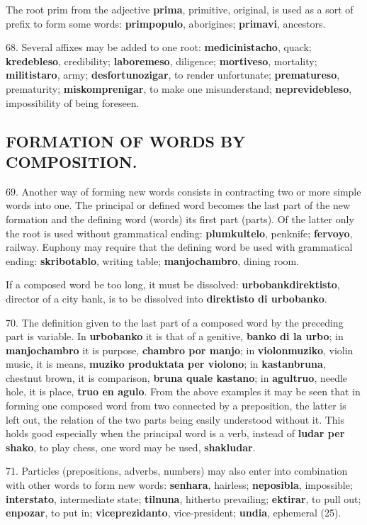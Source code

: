 The root prim from the adjective \textbf{prima}, primitive, original, is used as a sort of prefix to form some words: \textbf{primpopulo}, aborigines; \textbf{primavi}, ancestors. 

68. Several affixes may be added to one root: \textbf{medicinistacho}, quack; \textbf{kredebleso}, credibility; \textbf{laboremeso}, diligence; \textbf{mortiveso}, mortality; \textbf{militistaro}, army; \textbf{desfortunozigar}, to render unfortunate; \textbf{prematureso}, prematurity; \textbf{miskomprenigar}, to make one misunderstand; \textbf{neprevidebleso}, impossibility of being foreseen.

\subsection*{FORMATION OF WORDS BY COMPOSITION.}
69. Another way of forming new words consists in contracting two or more simple words into one. The principal or defined word becomes the last part of the new formation and the defining word (words) its first part (parts). Of the latter only the root is used without grammatical ending: \textbf{plumkultelo}, penknife; \textbf{fervoyo}, railway. Euphony may require that the defining word be used with grammatical ending: \textbf{skribotablo}, writing table; \textbf{manjochambro}, dining room. 

If a composed word be too long, it must be dissolved: \textbf{urbobankdirektisto}, director of a city bank, is to be dissolved into \textbf{direktisto di urbobanko}. 

70. The definition given to the last part of a composed word by the preceding part is variable. In \textbf{urbobanko} it is that of a genitive, \textbf{banko di la urbo}; in \textbf{manjochambro} it is purpose, \textbf{chambro por manjo}; in \textbf{violonmuziko}, violin music, it is means, \textbf{muziko produktata per violono}; in \textbf{kastanbruna}, chestnut brown, it is comparison, \textbf{bruna quale kastano}; in \textbf{agultruo}, needle hole, it is place, \textbf{truo en agulo}. From the above examples it may be seen that in forming one composed word from two connected by a preposition, the latter is left out, the relation of the two parts being easily understood without it. This holds good especially when the principal word is a verb, instead of \textbf{ludar per shako}, to play chess, one word may be used, \textbf{shakludar}. 

71. Particles (prepositions, adverbs, numbers) may also enter into combination with other words to form new words: \textbf{senhara}, hairless; \textbf{neposibla}, impossible; \textbf{interstato}, intermediate state; \textbf{tilnuna}, hitherto prevailing; \textbf{ektirar}, to pull out; \textbf{enpozar}, to put in; \textbf{viceprezidanto}, vice-president; \textbf{undia}, ephemeral (25). 

